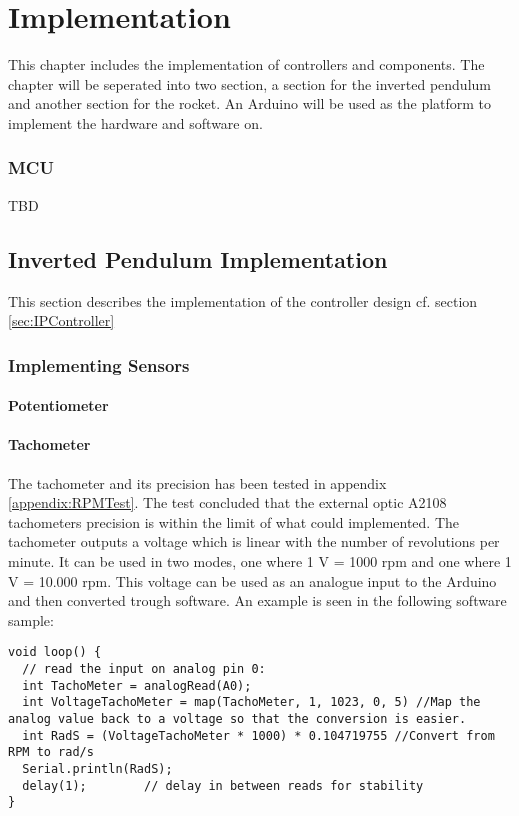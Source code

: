 \chapter{Implementation}
This chapter includes the implementation of controllers and components. The chapter will be seperated into two section, a section for the inverted pendulum and another section for the rocket. An Arduino will be used as the platform to implement the hardware and software on.    


\subsection{MCU}\label{sec:MCU}
TBD


\section{Inverted Pendulum Implementation}
This section describes the implementation of the controller design cf. section \ref{sec:IPController}

\subsection{Implementing Sensors}

\subsubsection*{Potentiometer}

\subsubsection*{Tachometer}
The tachometer and its precision has been tested in appendix \ref{appendix:RPMTest}. The test concluded that the external optic A2108 tachometers precision is within the limit of what could implemented. The tachometer outputs a voltage which is linear with the number of revolutions per minute. It can be used in two modes, one where 1 V = 1000 rpm and one where 1 V = 10.000 rpm. This voltage can be used as an analogue input to the Arduino and then converted trough software. An example is seen in the following software sample: 

\begin{lstlisting}
void loop() {
  // read the input on analog pin 0:
  int TachoMeter = analogRead(A0);
  int VoltageTachoMeter = map(TachoMeter, 1, 1023, 0, 5) //Map the analog value back to a voltage so that the conversion is easier.
  int RadS = (VoltageTachoMeter * 1000) * 0.104719755 //Convert from RPM to rad/s
  Serial.println(RadS);
  delay(1);        // delay in between reads for stability
}
\end{lstlisting}  


